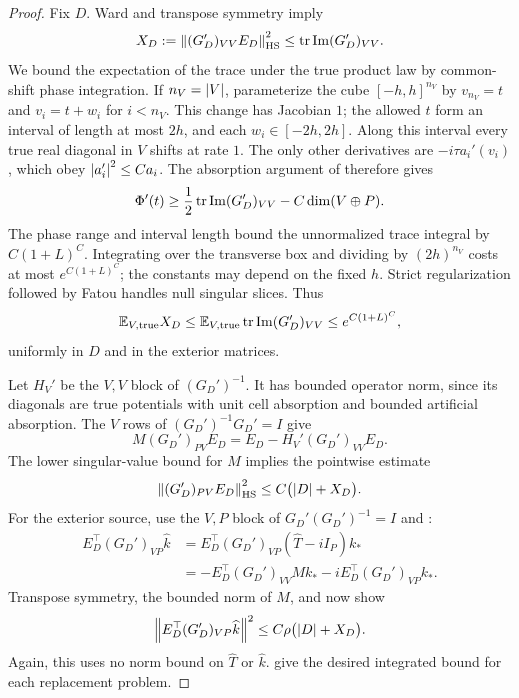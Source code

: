 \begin{proof}
Fix $D$. Ward and transpose symmetry imply
\begin{equation}
 X_D:=\left\lVert(G_D')_{VV}E_D\right\rVert_{\rm HS}^2
 \le\operatorname{tr}\operatorname{Im}(G_D')_{VV}.
 \label{trans:envelope-ward}
\end{equation}
We bound the expectation of the trace under the true product law
by common-shift phase integration. If $n_V=\left\lvert V\right\rvert$, parameterize
the cube $[-h,h]^{n_V}$ by $v_{n_V}=t$ and
$v_i=t+w_i$ for $i<n_V$. This change has Jacobian $1$; the allowed
$t$ form an interval of length at most $2h$, and each
$w_i\in[-2h,2h]$. Along this interval every true real diagonal in
$V$ shifts at rate $1$. The only other derivatives are
$-i\tau a_i'(v_i)$, which obey
$\left\lvert a_i'\right\rvert^2\le Ca_i$. The absorption argument of
 therefore gives
\[
 \Phi'(t)\ge\frac12\operatorname{tr}\operatorname{Im}(G_D')_{VV}
                -C\dim(V\oplus P).
\]
The phase range and interval length bound the unnormalized trace
integral by $C(1+L)^C$. Integrating over the transverse box and
dividing by $(2h)^{n_V}$ costs at most $e^{C(1+L)^C}$; the constants
may depend on the fixed $h$. Strict regularization followed by
Fatou handles null singular slices. Thus
\begin{equation}
 \mathbb E_{V,\rm true}X_D
 \le\mathbb E_{V,\rm true}\operatorname{tr}\operatorname{Im}(G_D')_{VV}
 \le e^{C(1+L)^C},
 \label{trans:envelope-phase}
\end{equation}
uniformly in $D$ and in the exterior matrices.

Let $H_V'$ be the $V,V$ block of $(G_D')^{-1}$. It has bounded
operator norm, since its diagonals are true potentials with unit
cell absorption and bounded artificial absorption. The $V$ rows of
$(G_D')^{-1}G_D'=I$ give
\[
 M(G_D')_{PV}E_D
   =E_D-H_V'(G_D')_{VV}E_D.
\]
The lower singular-value bound for $M$ implies the pointwise estimate
\begin{equation}
 \left\lVert(G_D')_{PV}E_D\right\rVert_{\rm HS}^2
 \le C\bigl(\left\lvert D\right\rvert+X_D\bigr).
 \label{trans:envelope-boundary-field}
\end{equation}
For the exterior source, use the $V,P$ block of
$G_D'(G_D')^{-1}=I$ and :
\begin{align*}
 E_D^\top(G_D')_{VP}\widehat k
 &=E_D^\top(G_D')_{VP}(\widehat T-iI_P)k_*\\
 &=-E_D^\top(G_D')_{VV}Mk_*
       -iE_D^\top(G_D')_{VP}k_*.
\end{align*}
Transpose symmetry, the bounded norm of $M$, and
 now show
\begin{equation}
 \left\lVert E_D^\top(G_D')_{VP}\widehat k\right\rVert^2
 \le C\rho\bigl(\left\lvert D\right\rvert+X_D\bigr).
 \label{trans:envelope-source}
\end{equation}
Again, this uses no norm bound on $\widehat T$ or $\widehat k$.
 give the
desired integrated bound for each replacement problem.


\end{proof}
